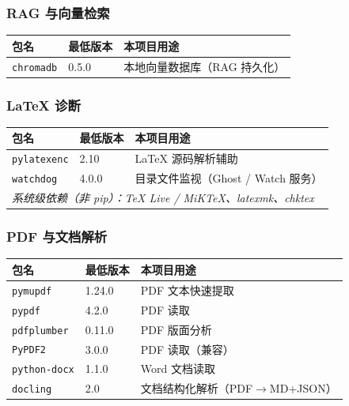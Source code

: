 \subsubsection{RAG 与向量检索}

\begin{longtable}{@{}p{}p{}p{}@{}}
\toprule
\textbf{包名} & \textbf{最低版本} & \textbf{本项目用途} \\
\midrule
\endhead
\texttt{chromadb} & 0.5.0 & 本地向量数据库（RAG 持久化） \\
\bottomrule
\end{longtable}

\subsubsection{LaTeX 诊断}

\begin{longtable}{@{}p{}p{}p{}@{}}
\toprule
\textbf{包名} & \textbf{最低版本} & \textbf{本项目用途} \\
\midrule
\endhead
\texttt{pylatexenc} & 2.10 & LaTeX 源码解析辅助 \\
\texttt{watchdog} & 4.0.0 & 目录文件监视（Ghost / Watch 服务） \\
\multicolumn{3}{l}{\textit{系统级依赖（非 pip）：TeX Live / MiKTeX、latexmk、chktex}} \\
\bottomrule
\end{longtable}

\subsubsection{PDF 与文档解析}

\begin{longtable}{@{}p{}p{}p{}@{}}
\toprule
\textbf{包名} & \textbf{最低版本} & \textbf{本项目用途} \\
\midrule
\endhead
\texttt{pymupdf} & 1.24.0 & PDF 文本快速提取 \\
\texttt{pypdf} & 4.2.0 & PDF 读取 \\
\texttt{pdfplumber} & 0.11.0 & PDF 版面分析 \\
\texttt{PyPDF2} & 3.0.0 & PDF 读取（兼容） \\
\texttt{python-docx} & 1.1.0 & Word 文档读取 \\
\texttt{docling} & 2.0 & 文档结构化解析（PDF$\rightarrow$MD+JSON） \\
\bottomrule
\end{longtable}

